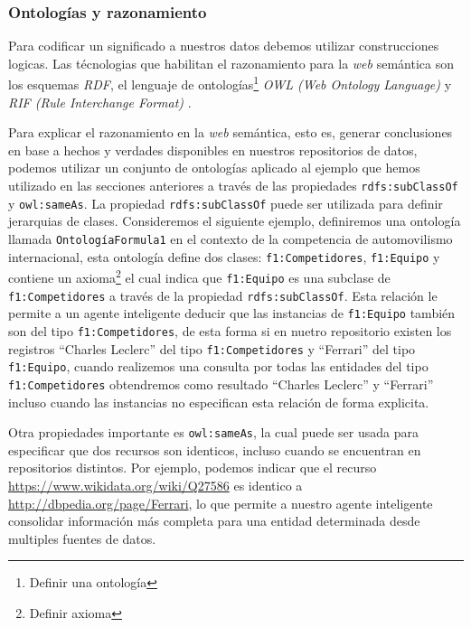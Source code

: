 \subsubsection{Ontologías y razonamiento}

Para codificar un significado a nuestros datos debemos utilizar construcciones
logicas. Las técnologias que habilitan el razonamiento para la \textit{web}
semántica son los esquemas \textit{RDF}, el lenguaje de
ontologías\footnote{Definir una ontología} \textit{OWL (Web Ontology Language)}
\cite{antoniou2004web} y \textit{RIF (Rule Interchange Format)}
\cite{kifer2008rule}.

Para explicar el razonamiento en la \textit{web} semántica, esto es, generar
conclusiones en base a hechos y verdades disponibles en nuestros repositorios de
datos, podemos utilizar un conjunto de ontologías aplicado al ejemplo que hemos
utilizado en las secciones anteriores a través de las propiedades
\texttt{rdfs:subClassOf} y \texttt{owl:sameAs}. La propiedad
\texttt{rdfs:subClassOf} puede ser utilizada para definir jerarquias de clases.
Consideremos el siguiente ejemplo, definiremos una ontología llamada
\texttt{OntologíaFormula1} en el contexto de la competencia de automovilismo
internacional, esta ontología define dos clases: \texttt{f1:Competidores},
\texttt{f1:Equipo} y contiene un axioma\footnote{Definir axioma} el cual indica
que \texttt{f1:Equipo} es una subclase de \texttt{f1:Competidores} a través de
la propiedad \texttt{rdfs:subClassOf}. Esta relación le permite a un agente
inteligente deducir que las instancias de \texttt{f1:Equipo} también son del
tipo \texttt{f1:Competidores}, de esta forma si en nuetro repositorio existen
los registros ``Charles Leclerc'' del tipo \texttt{f1:Competidores} y
``Ferrari'' del tipo \texttt{f1:Equipo}, cuando realizemos una consulta por
todas las entidades del tipo \texttt{f1:Competidores} obtendremos como resultado
``Charles Leclerc'' y ``Ferrari'' incluso cuando las instancias no especifican
esta relación de forma explicita.

Otra propiedades importante es \texttt{owl:sameAs}, la cual puede ser usada para
especificar que dos recursos son identicos, incluso cuando se encuentran en
repositorios distintos. Por ejemplo, podemos indicar que el recurso
\url{https://www.wikidata.org/wiki/Q27586} es identico a
\url{http://dbpedia.org/page/Ferrari}, lo que permite a nuestro agente inteligente consolidar
información más completa para una entidad determinada desde multiples fuentes de
datos.

